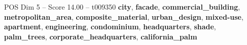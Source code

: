 \begin{textsample}{POS Dim 5 – Score 14.00 – t009350}  \label{ex:f5_pos_035}
\textbf{city}, \textbf{facade}, \textbf{commercial\_building}, \textbf{metropolitan\_area}, \textbf{composite\_material}, \textbf{urban\_design}, \textbf{mixed-use}, \textbf{apartment}, \textbf{engineering}, \textbf{condominium}, \textbf{headquarters}, \textbf{shade}, \textbf{palm\_trees}, \textbf{corporate\_headquarters}, \textbf{california\_palm}

\end{textsample}
